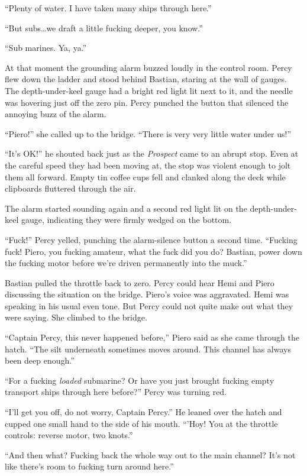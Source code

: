 \documentclass[
]{scrbook}
\begin{document}
``Plenty of water. I have taken many ships through here.''

``But subs\ldots we draft a little fucking deeper, you know.''

``Sub marines. Ya, ya.''

At that moment the grounding alarm buzzed loudly in the control room.
Percy flew down the ladder and stood behind Bastian, staring at the wall
of gauges. The depth-under-keel gauge had a bright red light lit next to
it, and the needle was hovering just off the zero pin. Percy punched the
button that silenced the annoying buzz of the alarm.

``Piero!'' she called up to the bridge. ``There is very very little
water under us!''

``It's OK!'' he shouted back just as the \emph{Prospect} came to an
abrupt stop. Even at the careful speed they had been moving at, the stop
was violent enough to jolt them all forward. Empty tin coffee cups fell
and clanked along the deck while clipboards fluttered through the air.

The alarm started sounding again and a second red light lit on the
depth-under-keel gauge, indicating they were firmly wedged on the
bottom.

``Fuck!'' Percy yelled, punching the alarm-silence button a second time.
``Fucking fuck! Piero, you fucking amateur, what the fuck did you do?
Bastian, power down the fucking motor before we're driven permanently
into the muck.''

Bastian pulled the throttle back to zero. Percy could hear Hemi and
Piero discussing the situation on the bridge. Piero's voice was
aggravated. Hemi was speaking in his usual even tone. But Percy could
not quite make out what they were saying. She climbed to the bridge.

``Captain Percy, this never happened before,'' Piero said as she came
through the hatch. ``The silt underneath sometimes moves around. This
channel has always been deep enough.''

``For a fucking \emph{loaded} submarine? Or have you just brought
fucking empty transport ships through here before?'' Percy was turning
red.

``I'll get you off, do not worry, Captain Percy.'' He leaned over the
hatch and cupped one small hand to the side of his mouth. ``'Hoy! You at
the throttle controls: reverse motor, two knots.''

``And then what? Fucking back the whole way out to the main channel?
It's not like there's room to fucking turn around here.''
\end{document}
